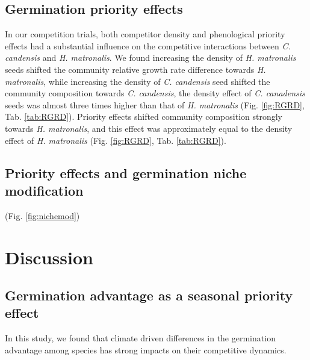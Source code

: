 \documentclass{article}\usepackage[]{graphicx}\usepackage[]{color}
\begin{document}
\subsection*{Germination priority effects}
In our competition trials, both competitor density and phenological priority effects had a substantial influence on the competitive interactions between \textit{C. candensis} and \textit{H. matronalis}. 
We found increasing the density of \textit{H. matronalis} seeds shifted the community relative growth rate difference towards \textit{H. matronalis}, while increasing the density of \textit{C. candensis} seed shifted the community composition towards \textit{C. candensis}, the density effect of \textit{C. canadensis} seeds was almost three times higher than that of \textit{H. matronalis} (Fig. \ref{fig:RGRD}, Tab. \ref{tab:RGRD}). Priority effects shifted community composition strongly towards \textit{H. matronalis}, and this effect was approximately equal to the density effect of \textit{H. matronalis} (Fig. \ref{fig:RGRD}, Tab. \ref{tab:RGRD}).

\subsection*{Priority effects and germination niche modification}
(Fig. \ref{fig:nichemod})

\section*{Discussion}

\subsection*{Germination advantage as a seasonal priority effect} 
In this study, we found that climate driven differences in the germination advantage among species has strong impacts on their competitive dynamics. 
\end{document}

